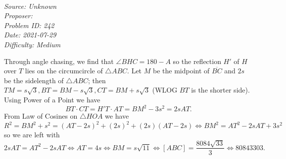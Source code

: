 \SSbreak\\
\emph{Source: Unknown}\\
\emph{Proposer: \Pnjoy}\\ %
\emph{Problem ID: 242}\\
\emph{Date: 2021-07-29}\\
\emph{Difficulty: Medium}\\
\SSbreak

\bigskip

\begin{solution}\hfil\medskip
  
    Through angle chasing, we find that $\angle BHC = 180 - A$ so the reflection $H'$ of  $H$ over $T$ 
    lies on the circumcircle of $\triangle ABC$. Let $M$ be the midpoint of $\overline{BC}$ and $2s$ be the sidelength of $\triangle ABC$; then 
    $TM = s\sqrt{3}, BT = BM - s\sqrt{3}, CT = BM + s\sqrt{3}$ (WLOG $BT$ is the shorter side). 
    Using Power of a Point we have $$BT \cdot CT = H'T \cdot AT = BM^2 - 3s^2 = 2sAT.$$ From 
    Law of Cosines on $\triangle HOA$ we have $$R^2 = BM^2 + s^2 = (AT - 2s)^2 + (2s)^2 + (2s)(AT - 2s) \iff BM^2 = AT^2 - 2sAT + 3s^2$$
    so we are left with $$2sAT = AT^2 - 2sAT \iff AT = 4s \iff BM = s\sqrt{11} \iff [ABC] = \dfrac{8084\sqrt{33}}{3} \iff \boxed{80843303}.$$
\end{solution}\bigskip
